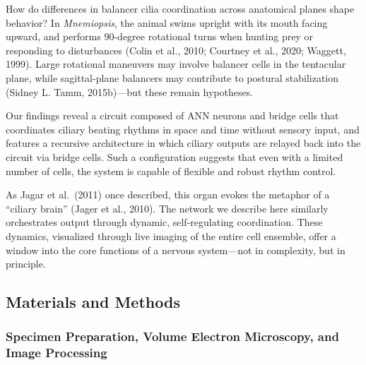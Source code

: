 \documentclass[
  11pt,
]{article}
\begin{document}
How do differences in balancer cilia coordination across anatomical
planes shape behavior? In \emph{Mnemiopsis}, the animal swims upright
with its mouth facing upward, and performs 90-degree rotational turns
when hunting prey or responding to disturbances (Colin et al., 2010;
Courtney et al., 2020; Waggett, 1999). Large rotational maneuvers may
involve balancer cells in the tentacular plane, while sagittal-plane
balancers may contribute to postural stabilization (Sidney L. Tamm,
2015b)---but these remain hypotheses.

Our findings reveal a circuit composed of ANN neurons and bridge cells
that coordinates ciliary beating rhythms in space and time without
sensory input, and features a recursive architecture in which ciliary
outputs are relayed back into the circuit via bridge cells. Such a
configuration suggests that even with a limited number of cells, the
system is capable of flexible and robust rhythm control.

As Jagar et al.~(2011) once described, this organ evokes the metaphor of
a ``ciliary brain'' (Jager et al., 2010). The network we describe here
similarly orchestrates output through dynamic, self-regulating
coordination. These dynamics, visualized through live imaging of the
entire cell ensemble, offer a window into the core functions of a
nervous system---not in complexity, but in principle.

\subsection{Materials and Methods}\label{materials-and-methods}

\subsubsection{Specimen Preparation, Volume Electron Microscopy, and
Image
Processing}\label{specimen-preparation-volume-electron-microscopy-and-image-processing}
\end{document}

